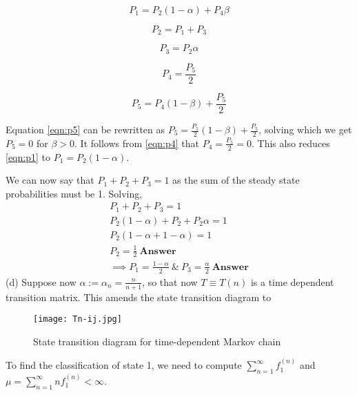 \begin{equation}\label{eqn:p1}
P_1 = P_2(1-\alpha) + P_4\beta
\end{equation}

\begin{equation}\label{eqn:p2}
P_2 = P_1 + P_3
\end{equation}

\begin{equation}\label{eqn:p3}
P_3 = P_2\alpha
\end{equation}

\begin{equation}\label{eqn:p4}
P_4 = \frac{P_5}{2}
\end{equation}

\begin{equation}\label{eqn:p5}
P_5 = P_4(1-\beta)+\frac{P_5}{2}
\end{equation}

Equation \ref{eqn:p5} can be rewritten as $P_5 = \frac{P_5}{2}(1-\beta) + \frac{P_5}{2}$, solving which we get $P_5=0$ for $\beta>0$. It follows from \ref{eqn:p4} that $P_4=\frac{P_5}{2} = 0$. This also reduces \ref{eqn:p1} to $P_1 = P_2(1-\alpha)$.

We can now say that $P_1 + P_2 + P_3=1$ as the sum of the steady state probabilities must be 1. Solving,
\begin{gather*}
P_1 + P_2 + P_3 = 1\\
P_2(1-\alpha) + P_2 + P_2\alpha = 1\\
P_2(1 - \alpha + 1 - \alpha) = 1\\
P_2 = \frac{1}{2}\ \textbf{Answer}\\
\implies P_1 = \frac{1-\alpha}{2} \ \& \ P_3 = \frac{\alpha}{2}\ \textbf{Answer}
\end{gather*}
(d)  Suppose now $\alpha := \alpha_n = \frac{n}{n + 1}$, so that now $T \equiv T(n)$ is a time dependent transition
matrix. This amends the state transition diagram to 
\begin{figure}[H]
\centering
\texttt{[image: Tn-ij.jpg]}
\caption{\label{fig:Tn-ij}State transition diagram for time-dependent Markov chain}
\end{figure}
To find the classification of state 1, we need to compute $\sum_{n=1}^{\infty}f_{1}^{(n)}$ and $\mu=\sum_{n=1}^{\infty}nf_{1}^{(n)} < \infty$.

